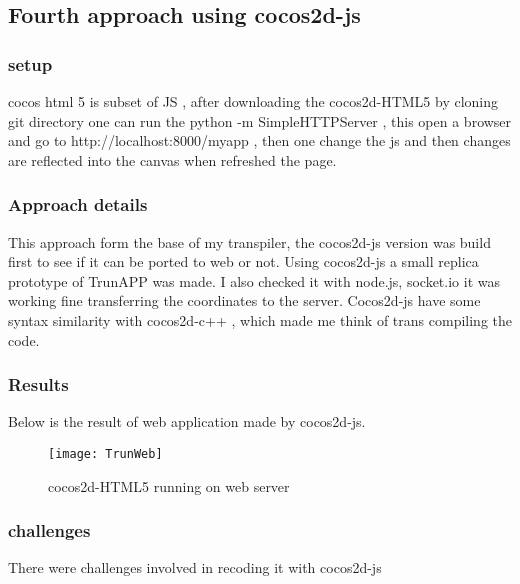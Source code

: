 \documentclass[23pt]{article}
\begin{document}
\subsection{Fourth approach using cocos2d-js }

\subsubsection{setup}

{\Large cocos html 5 is subset of JS , after downloading the cocos2d-HTML5 by cloning git directory one can run the python -m SimpleHTTPServer ,
this open a browser and go to http://localhost:8000/myapp , then one change the js and then changes are reflected into the canvas when refreshed the page.
\\ \par}
\subsubsection{Approach details}

{\Large This approach form the base of my transpiler, the cocos2d-js version was build first to see if it can be ported to web or not. Using cocos2d-js a small replica prototype of TrunAPP was made. I also checked it with node.js, socket.io it was working fine transferring the coordinates to the server.  
Cocos2d-js have some syntax similarity with cocos2d-c++ , which made me think of trans compiling the code.  \par}

\subsubsection{Results}

{\Large Below is the result of web application made by cocos2d-js. \par}

\begin{figure}[h]
\caption{cocos2d-HTML5 running on web server}
\centering
\texttt{[image: TrunWeb]}
\end{figure}

\subsubsection{challenges}

{\Large There were challenges involved in recoding it with cocos2d-js \par}
\end{document}

